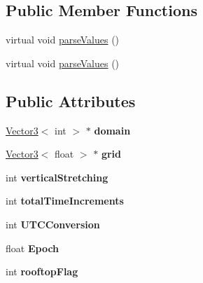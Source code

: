 \subsection*{Public Member Functions}
\begin{DoxyCompactItemize}
\item 
virtual void \hyperlink{classSimulationParameters_a306c6d373794f5186beec9026f56845c}{parse\+Values} ()
\item 
virtual void \hyperlink{classSimulationParameters_a306c6d373794f5186beec9026f56845c}{parse\+Values} ()
\end{DoxyCompactItemize}
\subsection*{Public Attributes}
\begin{DoxyCompactItemize}
\item 
\mbox{\label{classSimulationParameters_a35f2a333d5d019425a16579a34dd1956}} 
\hyperlink{classVector3}{Vector3}$<$ int $>$ $\ast$ {\bfseries domain}
\item 
\mbox{\label{classSimulationParameters_acc14170c2c36cafb307be92674b1cc39}} 
\hyperlink{classVector3}{Vector3}$<$ float $>$ $\ast$ {\bfseries grid}
\item 
\mbox{\label{classSimulationParameters_a9502bf08efbca3b43d2c1a1ec3ceb80b}} 
int {\bfseries vertical\+Stretching}
\item 
\mbox{\label{classSimulationParameters_a54499bd3028a6488dbfc59b0d6471444}} 
int {\bfseries total\+Time\+Increments}
\item 
\mbox{\label{classSimulationParameters_a2d4701335d74b394a7a25b86371f8337}} 
int {\bfseries U\+T\+C\+Conversion}
\item 
\mbox{\label{classSimulationParameters_ae96bebaef08a0234f1e37617dd204a7e}} 
float {\bfseries Epoch}
\item 
\mbox{\label{classSimulationParameters_a938d73fe33bd42d8c180775e4a52bf9e}} 
int {\bfseries rooftop\+Flag}
\item 

\end{DoxyCompactItemize}
